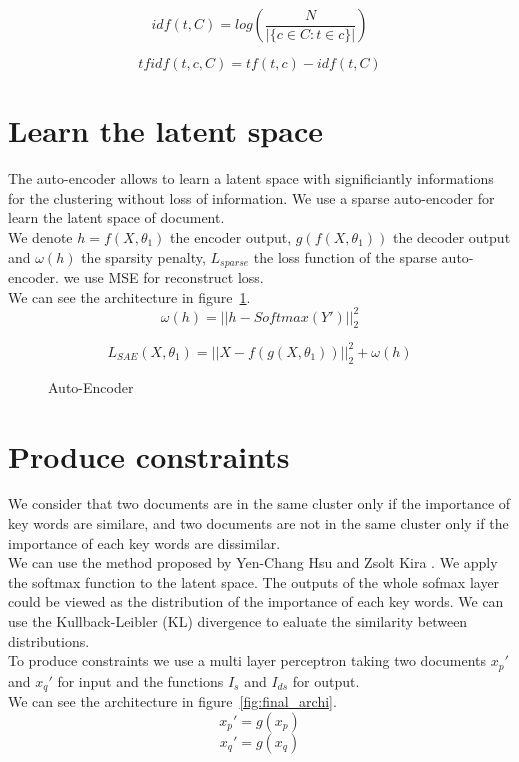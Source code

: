 \documentclass{article}
\begin{document}
\begin{equation}\label{eq:idf}
  idf(t, C) = log(\frac{N}{| \{ c \in C : t \in c \}  |})
\end{equation}

\begin{equation}\label{eq:tfidf}
  tfidf(t,c,C) = tf(t,c) - idf(t,C)
\end{equation}


\section{Learn the latent space}

The auto-encoder allows to learn a latent space with significiantly
informations for the clustering without loss of information.
We use a sparse auto-encoder for learn the latent space of document.
\\
We denote $h=f(X, \theta_1)$ the encoder output, $g(f(X, \theta_1))$
the decoder output and $\omega(h)$ the sparsity penalty, $L_{sparse}$
the loss function of the sparse auto-encoder. we use MSE for
reconstruct loss.
\\
We can see the architecture in figure~\ref{fig:archi}.
\begin{equation}\label{eq:omega}
  \omega(h) = || h - Softmax(Y')||_2^2
\end{equation}

\begin{equation}\label{eq:Sparse}
  L_{SAE}(X, \theta_1) = ||X - f(g(X, \theta_1))||_2^2 + \omega(h)  
\end{equation}

\begin{figure}[!t]
  \centering
  
  \caption{Auto-Encoder}
  \label{fig:archi}
\end{figure}
\section{Produce constraints}

We consider that two documents are in the same cluster only if the
importance of key words are similare, and two documents are not in the
same cluster only if the importance of each key words are dissimilar.
\\
We can use the method proposed by Yen-Chang Hsu and Zsolt Kira
\cite{2015arXiv151106321H}. We apply the softmax function to the
latent space. The outputs of the whole sofmax layer could be viewed as
the distribution of the importance of each key words. We can use the
Kullback-Leibler (KL) divergence to ealuate the similarity between
distributions.
\\
To produce constraints we use a multi layer perceptron taking two
documents $x_p'$ and $x_q'$ for input and the functions $I_s$ and
$I_{ds}$ for output.
\\
We can see the architecture in figure~\ref{fig:final_archi}.
\begin{equation}
  x_p' = g(x_p)
\end{equation}
\begin{equation}
  x_q' = g(x_q)
\end{equation}
\end{document}
